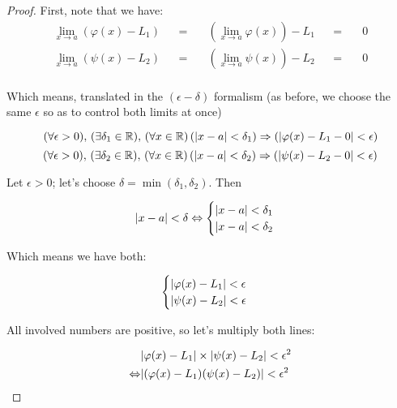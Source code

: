 \documentclass[solutions.tex]{subfiles}
\begin{document}
\begin{proof}
First, note that we have:
\begin{equation*} \begin{aligned}
	\lim_{x\rightarrow a}(\varphi(x)-L_1) &&=\quad&
		(\lim_{x\rightarrow a}\varphi(x))-L_1 &&=\quad& 0 \\
	\lim_{x\rightarrow a}(\psi(x)-L_2) &&=\quad&
		(\lim_{x\rightarrow a}\psi(x))-L_2 &&=\quad& 0 \\
\end{aligned} \end{equation*}

Which means, translated in the $(\epsilon-\delta)$ formalism (as
before, we choose the same $\epsilon$ so as to control both limits
at once)

\[ \epsdelta{\epsilon}{\delta_1}{a}{x}{\varphi(x)-L_1}{0}  \]
\[ \epsdelta{\epsilon}{\delta_2}{a}{x}{\psi(x)-L_2}{0}     \]

Let $\epsilon > 0$; let's choose $\delta=\min(\delta_1,\delta_2)$.
Then

\begin{equation*} \begin{aligned}
	\abs{x-a}<\delta \Leftrightarrow \begin{cases}
		\abs{x-a} < \delta_1 \\
		\abs{x-a} < \delta_2
	\end{cases}
\end{aligned} \end{equation*}

Which means we have both:

\begin{equation*} \begin{aligned}
	\begin{cases}
		\abs{\varphi(x)-L_1} < \epsilon \\
		\abs{\psi(x)-L_2} < \epsilon
	\end{cases}
\end{aligned} \end{equation*}

All involved numbers are positive, so let's multiply both lines:

\begin{equation*} \begin{aligned}
	~ & \abs{\varphi(x)-L_1}\times\abs{\psi(x)-L_2} < \epsilon^2 \\
	\Leftrightarrow & \abs{(\varphi(x)-L_1)(\psi(x)-L_2)} < \epsilon^2
\end{aligned} \end{equation*}


\end{proof}
\end{document}
